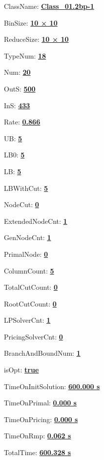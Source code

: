\documentclass[11pt]{article}
\begin{document}
\pagestyle{empty}


ClassName: \underline{\textbf{Class_01.2bp-1}}
\par
BinSize: \underline{\textbf{10 × 10}}
\par
ReduceSize: \underline{\textbf{10 × 10}}
\par
TypeNum: \underline{\textbf{18}}
\par
Num: \underline{\textbf{20}}
\par
OutS: \underline{\textbf{500}}
\par
InS: \underline{\textbf{433}}
\par
Rate: \underline{\textbf{0.866}}
\par
UB: \underline{\textbf{5}}
\par
LB0: \underline{\textbf{5}}
\par
LB: \underline{\textbf{5}}
\par
LBWithCut: \underline{\textbf{5}}
\par
NodeCut: \underline{\textbf{0}}
\par
ExtendedNodeCnt: \underline{\textbf{1}}
\par
GenNodeCnt: \underline{\textbf{1}}
\par
PrimalNode: \underline{\textbf{0}}
\par
ColumnCount: \underline{\textbf{5}}
\par
TotalCutCount: \underline{\textbf{0}}
\par
RootCutCount: \underline{\textbf{0}}
\par
LPSolverCnt: \underline{\textbf{1}}
\par
PricingSolverCnt: \underline{\textbf{0}}
\par
BranchAndBoundNum: \underline{\textbf{1}}
\par
isOpt: \underline{\textbf{true}}
\par
TimeOnInitSolution: \underline{\textbf{600.000 s}}
\par
TimeOnPrimal: \underline{\textbf{0.000 s}}
\par
TimeOnPricing: \underline{\textbf{0.000 s}}
\par
TimeOnRmp: \underline{\textbf{0.062 s}}
\par
TotalTime: \underline{\textbf{600.328 s}}
\par
\newpage


\end{document}
